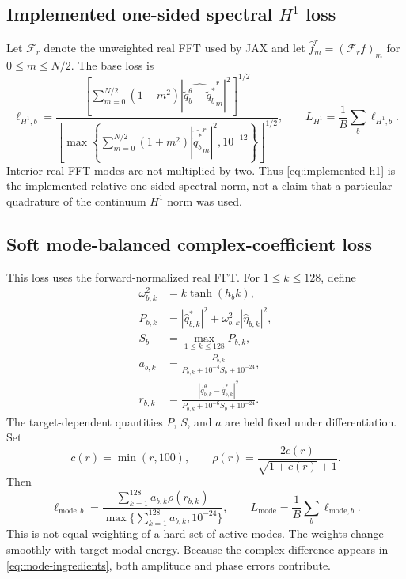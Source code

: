 \documentclass[11pt]{article}
\begin{document}
\subsection{Implemented one-sided spectral \texorpdfstring{$H^1$}{H1} loss}

Let $\mathcal F_r$ denote the unweighted real FFT used by JAX and let
$\widehat f_m^r=(\mathcal F_r f)_m$ for $0\leq m\leq N/2$.  The base loss is
\begin{equation}
  \ell_{H^1,b}
  =\frac{
  \left[\sum_{m=0}^{N/2}(1+m^2)
  |\widehat{\widetilde q_b^\theta-\widetilde q_b^*}^{r}_m|^2\right]^{1/2}}
  {\left[\max\left\{
  \sum_{m=0}^{N/2}(1+m^2)|\widehat{\widetilde q_b^*}^{r}_m|^2,
  10^{-12}\right\}\right]^{1/2}},
  \qquad
  L_{H^1}=\frac1B\sum_b\ell_{H^1,b}.
  \label{eq:implemented-h1}
\end{equation}
Interior real-FFT modes are not multiplied by two.  Thus
\eqref{eq:implemented-h1} is the implemented relative one-sided spectral norm,
not a claim that a particular quadrature of the continuum $H^1$ norm was used.

\subsection{Soft mode-balanced complex-coefficient loss}

This loss uses the forward-normalized real FFT.  For $1\leq k\leq128$, define
\begin{align}
  \omega_{b,k}^2&=k\tanh(h_bk),\\
  P_{b,k}&=|\widehat q^*_{b,k}|^2
       +\omega_{b,k}^2|\widehat\eta_{b,k}|^2,\\
  S_b&=\max_{1\leq k\leq128}P_{b,k},\\
  a_{b,k}&=\frac{P_{b,k}}{P_{b,k}+10^{-4}S_b+10^{-24}},\\
  r_{b,k}&=\frac{|\widehat q^\theta_{b,k}-\widehat q^*_{b,k}|^2}
  {P_{b,k}+10^{-6}S_b+10^{-24}}.
  \label{eq:mode-ingredients}
\end{align}
The target-dependent quantities $P$, $S$, and $a$ are held fixed under
differentiation.  Set
\begin{equation}
  c(r)=\min(r,100),
  \qquad
  \rho(r)=\frac{2c(r)}{\sqrt{1+c(r)}+1}.
  \label{eq:mode-robust}
\end{equation}
Then
\begin{equation}
  \ell_{\mathrm{mode},b}
  =\frac{\sum_{k=1}^{128}a_{b,k}\rho(r_{b,k})}
  {\max\{\sum_{k=1}^{128}a_{b,k},10^{-24}\}},
  \qquad
  L_{\mathrm{mode}}=\frac1B\sum_b\ell_{\mathrm{mode},b}.
  \label{eq:mode-loss}
\end{equation}
This is not equal weighting of a hard set of active modes.  The weights change
smoothly with target modal energy.  Because the complex difference appears in
\eqref{eq:mode-ingredients}, both amplitude and phase errors contribute.
\end{document}

